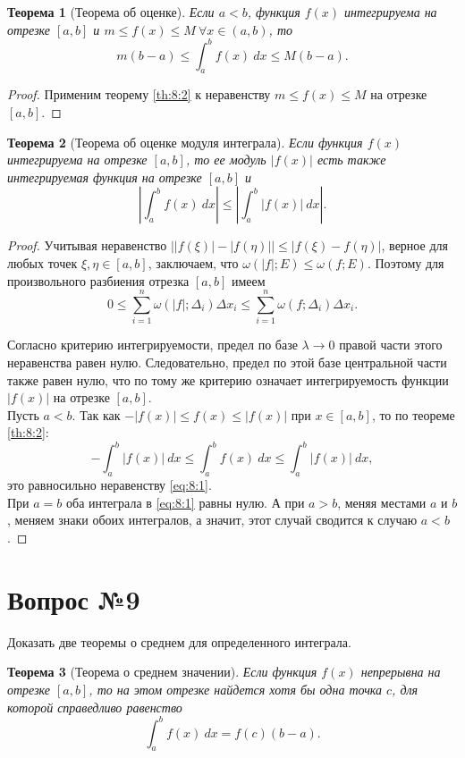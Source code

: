 \documentclass[12pt]{report}
\numberwithin{equation}{section}
\newtheorem{theorem}{Теорема}[section]
\begin{document}
\begin{theorem}[Теорема об оценке]
Если $a < b$, функция $f(x)$ интегрируема на отрезке $[a,b]$ и $m \leqslant f(x) \leqslant M~\forall x \in (a,b)$, то
\[ m(b-a) \leqslant \int_a^b f(x)~dx \leqslant M(b-a).\]
\end{theorem}
\begin{proof}
Применим теорему \ref{th:8:2} к неравенству $m \leqslant f(x) \leqslant M$ на отрезке $[a,b]$.
\end{proof}
\begin{theorem}[Теорема об оценке модуля интеграла]
Если функция $f(x)$ интегрируема на отрезке $[a,b]$, то ее модуль $|f(x)|$ есть также интегрируемая функция на отрезке $[a,b]$ и
\begin{equation}\label{eq:8:1}
\left| \int_a^b f(x)~dx\right| \leqslant \left| \int_a^b |f(x)|~dx\right|. 
\end{equation}
\end{theorem}

\begin{proof}
Учитывая неравенство $\left| |f(\xi)| - |f(\eta)| \right| \leqslant \left| f(\xi) - f(\eta) \right|$, верное для любых точек $\xi, \eta \in [a,b]$, заключаем, что $\omega(|f|; E) \leqslant \omega(f; E)$. Поэтому для произвольного разбиения отрезка $[a,b]$ имеем
\[ 0 \leqslant \sum_{i=1}^n \omega(|f|; \Delta_i) \Delta x_i \leqslant \sum_{i=1}^n \omega(f; \Delta_i) \Delta x_i.\]

Согласно критерию интегрируемости, предел по базе $\lambda \to 0$ правой части этого неравенства равен нулю. Следовательно, предел по этой базе центральной части также равен нулю, что по тому же критерию означает интегрируемость функции $|f(x)|$ на отрезке $[a,b]$.\\

Пусть $a < b$. Так как $-|f(x)| \leqslant f(x) \leqslant |f(x)|$ при $x \in [a,b]$, то по теореме \ref{th:8:2}:
\[ - \int_a^b |f(x)|~dx \leqslant \int_a^b f(x)~dx \leqslant \int_a^b |f(x)|~dx,\]
это равносильно неравенству \eqref{eq:8:1}.\\

При $a = b$ оба интеграла в \eqref{eq:8:1} равны нулю. А при $a > b$, меняя местами $a$ и $b$, меняем знаки обоих интегралов, а значит, этот случай сводится к случаю $a < b$.
\end{proof}

\newpage \section{Вопрос №9} %
\begin{framed}
Доказать две теоремы о среднем для определенного интеграла.
\end{framed}
\begin{theorem}[Теорема о среднем значении]
Если функция $f(x)$  непрерывна на отрезке $[a,b]$, то на этом отрезке найдется хотя бы одна точка $c$, для которой справедливо равенство
\begin{equation}\label{eq:9:1}
\int_a^b f(x)~ dx = f(c) (b-a).
\end{equation}
\end{theorem}
\end{document}
